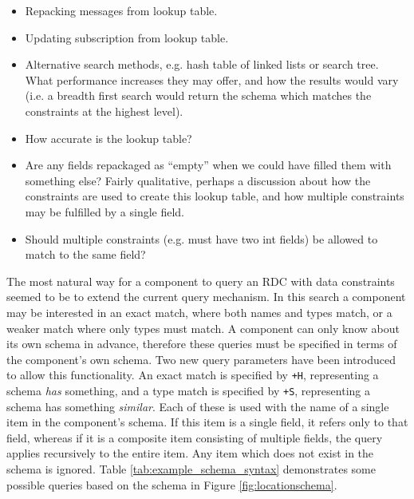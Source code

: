 \documentclass[12pt,twoside,notitlepage]{report}
\begin{document}
\begin{itemize}

\item Repacking messages from lookup table.

\item Updating subscription from lookup table.

\item Alternative search methods, e.g. hash table of linked lists or search tree. What performance increases they may offer, and how the results would vary (i.e. a breadth first search would return the schema which matches the constraints at the highest level).

\item How accurate is the lookup table?
 
\item Are any fields repackaged as ``empty'' when we could have filled them with something else? Fairly qualitative, perhaps a discussion about how the constraints are used to create this lookup table, and how multiple constraints may be fulfilled by a single field.

\item Should multiple constraints (e.g. must have two int fields) be allowed to match to the same field?

\end{itemize}

The most natural way for a component to query an RDC with data constraints seemed to be to extend the current query mechanism. 
In this search a component may be interested in an exact match, where both names and types match, or a weaker match where only types must match. 
A component can only know about its own schema in advance, therefore these queries must be specified in terms of the component's own schema.
Two new query parameters have been introduced to allow this functionality. 
An exact match is specified by {\tt +H}, representing a schema {\sl has} something, and a type match is specified by {\tt +S}, representing a schema has something {\sl similar}.
Each of these is used with the name of a single item in the component's schema.
If this item is a single field, it refers only to that field, whereas if it is a composite item consisting of multiple fields, the query applies recursively to the entire item. 
Any item which does not exist in the schema is ignored. 
Table \ref{tab:example_schema_syntax} demonstrates some possible queries based on the schema in Figure \ref{fig:locationschema}.
\end{document}
